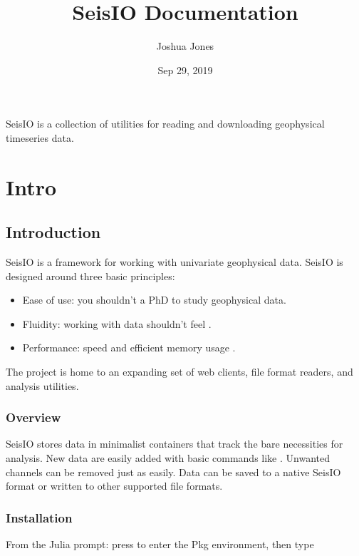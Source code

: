 \documentclass[letterpaper,11pt,english]{sphinxmanual}
\title{SeisIO Documentation}
\date{Sep 29, 2019}
\author{Joshua Jones}
\begin{document}
\pagestyle{empty}
\sphinxmaketitle
\pagestyle{plain}
\sphinxtableofcontents
\pagestyle{normal}
\label{\detokenize{index::doc}}


SeisIO is a collection of utilities for reading and downloading geophysical timeseries data.


\chapter{Intro}
\label{\detokenize{index:intro}}

\section{Introduction}
\label{\detokenize{src/intro:introduction}}\label{\detokenize{src/intro::doc}}
SeisIO is a framework for working with univariate geophysical data.
SeisIO is designed around three basic principles:
\begin{itemize}
\item {} 
Ease of use: you shouldn’t  a PhD to study geophysical data.

\item {} 
Fluidity: working with data shouldn’t feel .

\item {} 
Performance: speed and efficient memory usage .

\end{itemize}

The project is home to an expanding set of web clients, file format readers,
and analysis utilities.


\subsection{Overview}
\label{\detokenize{src/intro:overview}}
SeisIO stores data in minimalist containers that track the bare necessities for
analysis. New data are easily added with basic commands like \sphinxcode{\sphinxupquote{+}}. Unwanted
channels can be removed just as easily. Data can be saved to a native SeisIO
format or written to other supported file formats.


\subsection{Installation}
\label{\detokenize{src/intro:installation}}
From the Julia prompt: press \sphinxcode{\sphinxupquote{{]}}} to enter the Pkg environment, then type
\end{document}
